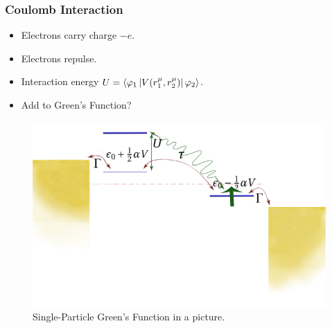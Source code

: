 \begin{frame}
    \frametitle{Coulomb Interaction}
     \begin{itemize}
     \item Electrons carry charge $-e$.
     \item Electrons repulse.
     \item Interaction energy $U = \braket{\varphi_1 \left| V(r^\mu_1, r^\mu_2)\right|\varphi_2}$.
     \item Add to Green's Function?
     \end{itemize}
    
    \begin{figure}[!b] 
        \centering
        \includegraphics[height=0.5\textheight]{fig/interacting_schematics.pdf}
        \caption{Single-Particle Green's Function in a picture.}
    \end{figure} 
\end{frame}
